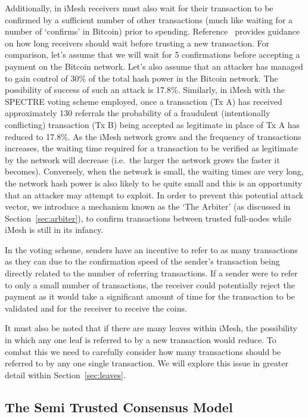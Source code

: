 \documentclass[a4paper,10pt,twocolumn]{article}
\begin{document}
 Additionally, in iMesh receivers must also wait for their transaction to be confirmed by a sufficient number of other transactions 
 (much like waiting for a number of `confirms' in Bitcoin) prior to spending. Reference~\cite{spectre} provides guidance on how long receivers 
 should wait before trusting a new transaction. For comparison, let's assume that we will wait for 5 confirmations before accepting a 
 payment on the Bitcoin network. Let's also assume that an attacker has managed to gain control of 30\% of the total hash power in the 
 Bitcoin network. The possibility of success of such an attack is 17.8\%\cite{btc}. Similarly, in iMesh with the SPECTRE voting scheme 
 employed, once a transaction (Tx A) has received approximately 130 referrals the probability of a fraudulent (intentionally conflicting) 
 transaction (Tx B) being accepted as legitimate in place of Tx A has reduced to 17.8\%. As the iMesh network grows and the frequency of 
 transactions increases, the waiting time required for a transaction to be verified as legitimate by the network will decrease (i.e.\ the 
 larger the network grows the faster it becomes). Conversely, when the network is small, the waiting times are very long, the 
 network hash power is also likely to be quite small and this is an opportunity that an attacker may attempt to exploit. 
In order to prevent this potential attack vector, we introduce a mechanism known as the `The Arbiter' (as discussed in Section~\ref{sec:arbiter}), 
to confirm transactions between trusted full-nodes while iMesh is still in its infancy.

In the voting scheme, senders have an incentive to refer to as many transactions as they can due to the confirmation speed of the 
sender's transaction being directly related to the number of referring transactions. If a sender were to refer to only a small number of 
transactions, the receiver could potentially reject the payment as it would take a significant amount of time for the transaction to be 
validated and for the receiver to receive the coins.

It must also be noted that if there are many leaves within iMesh, the possibility in which any one leaf is referred to by a new 
transaction would reduce. To combat this we need to carefully consider how many transactions should be referred to by any one single 
transaction. We will explore this issue in greater detail within Section~\ref{sec:leaves}.

\subsection{The Semi Trusted Consensus Model}
\label{sec:stcm}
\end{document}
